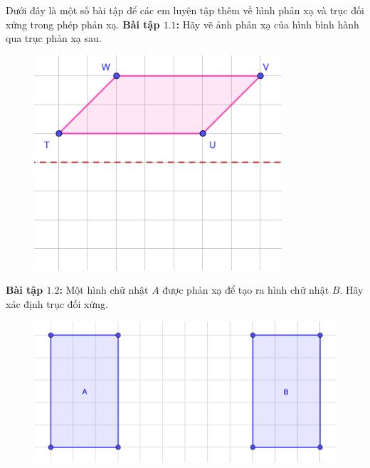 \begin{multicols}{2}
\begin{figure}[H]
		\vspace*{-10pt}
	\end{figure}
	Dưới đây là một số bài tập để các em luyện tập thêm về hình phản xạ và trục đối xứng trong phép phản xạ.
	\vskip 0.1cm
	\textbf{\color{toancuabi}Bài tập $\pmb{1.1}$:} Hãy vẽ ảnh phản xạ của hình bình hành qua trục phản xạ sau.
	\begin{figure}[H]
		\vspace*{-5pt}
		\centering
		\captionsetup{labelformat= empty, justification=centering}
		\includegraphics[width= 0.75\linewidth]{Picture6}
		\vspace*{-10pt}
	\end{figure}
	\textbf{\color{toancuabi}Bài tập $\pmb{1.2}$:} Một hình chữ nhật $A$ được phản xạ để tạo ra hình chữ nhật $B$. Hãy xác định trục đối xứng.
	\begin{figure}[H]
		\vspace*{-5pt}
		\centering
		\captionsetup{labelformat= empty, justification=centering}
		\includegraphics[width= 1\linewidth]{Picture7}
		\vspace*{-10pt}
	\end{figure}

\end{multicols}
